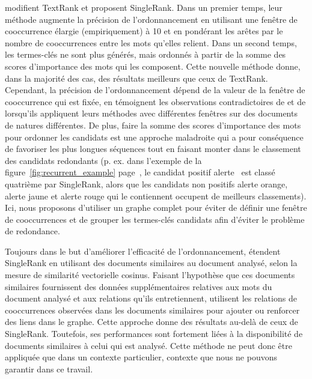      modifient TextRank et proposent SingleRank. Dans
    un premier temps, leur méthode augmente la précision de l'ordonnancement en
    utilisant une fenêtre de cooccurrence élargie (empiriquement) à 10 et en
    pondérant les arêtes par le nombre de cooccurrences entre les mots qu'elles
    relient. Dans un second temps, les termes-clés ne sont plus générés, mais
    ordonnés à partir de la somme des scores d'importance des mots qui les
    composent. Cette nouvelle méthode donne, dans la majorité des cas, des
    résultats meilleurs que ceux de TextRank. Cependant, la précision de
    l'ordonnancement dépend de la valeur de la fenêtre de cooccurrence qui est
    fixée, en témoignent les observations contradictoires de
     et de  lorsqu'ils
    appliquent leurs méthodes avec différentes fenêtres sur des documents de
    natures différentes. De plus, faire la somme des scores d'importance des mots
    pour ordonner les candidats est une approche maladroite qui a pour
    conséquence de favoriser les plus longues séquences tout en faisant monter
    dans le classement des candidats redondants (p.
    ex. dans l'exemple de la figure~\ref{fig:recurrent_example}
    page~\pageref{fig:recurrent_example}, le candidat positif \og{}alerte~\fg{}
    est classé quatrième par SingleRank, alors que les candidats non positifs
    \og{}alerte orange\fg{}, \og{}alerte jaune\fg{} et \og{}alerte rouge\fg{}
    qui le contiennent occupent de meilleurs classements). Ici, nous proposons
    d'utiliser un graphe complet pour éviter de définir une fenêtre de
    cooccurrences et de grouper les termes-clés candidats afin d'éviter le
    problème de redondance.

    Toujours dans le but d'améliorer l'efficacité de l'ordonnancement,
     étendent SingleRank en utilisant des documents
    similaires au document analysé, selon la mesure de similarité vectorielle
    cosinus. Faisant l'hypothèse que ces documents similaires fournissent des
    données supplémentaires relatives aux mots du document analysé et aux
    relations qu'ils entretiennent,  utilisent les
    relations de cooccurrences observées dans les documents similaires pour
    ajouter ou renforcer des liens dans le graphe. Cette approche donne des
    résultats au-delà de ceux de SingleRank. Toutefois, ses performances sont
    fortement liées à la disponibilité de documents similaires à celui qui est
    analysé. Cette méthode ne peut donc être appliquée que dans un contexte
    particulier, contexte que nous ne pouvons garantir dans ce travail.

